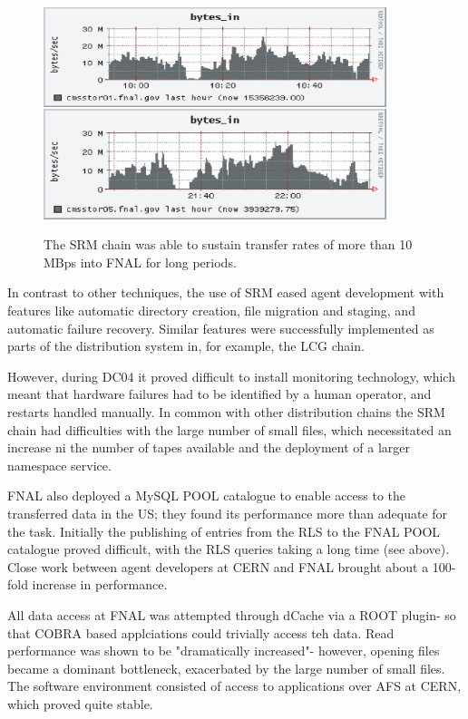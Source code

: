 \documentclass{cmspaper}
\begin{document}
\begin{figure}[tbp]
\centering
\includegraphics[width=10cm]{FNAL-network.eps}
\label{fig:FNAL-network}
\caption{The SRM chain was able to sustain transfer rates of more than 10 MBps into FNAL for long periods.}
\end{figure} 

In contrast to other techniques, the use of SRM eased agent development with features like automatic directory creation, file migration and staging, and automatic failure recovery. Similar features were successfully implemented as parts of the distribution system in, for example, the LCG chain.

However, during DC04 it proved difficult to install monitoring technology, which meant that hardware failures had to be identified by a human operator, and restarts handled manually. In common with other distribution chains the SRM chain had difficulties with the large number of small files, which necessitated an increase ni the number of tapes available and the deployment of a larger namespace service.

FNAL also deployed a MySQL POOL catalogue to enable access to the transferred data in the US; they found its performance more than adequate for the task. Initially the publishing of entries from the RLS to the FNAL POOL catalogue proved difficult, with the RLS queries taking a long time (see above). Close work between agent developers at CERN and FNAL brought about a 100-fold increase in performance.

All data access at FNAL was attempted through dCache via a ROOT plugin- so that COBRA based applciations could trivially access teh data. Read performance was shown to be "dramatically increased"- however, opening files became a dominant bottleneck, exacerbated by the large number of small files. The software environment consisted of access to applications over AFS at CERN, which proved quite stable.
\end{document}
